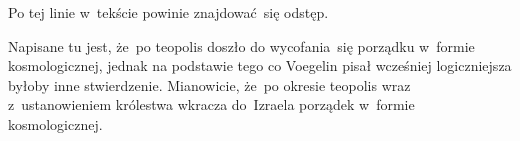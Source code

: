 \documentclass[a4paper,11pt]{article}
\begin{document}
\vspace{\spaceFour}





\start {} Po tej linie w~tekście powinie znajdować~się
odstęp.

\vspace{\spaceFour}





\start {} Napisane tu jest, że~po teopolis doszło do
wycofania~się porządku w~formie kosmologicznej, jednak na podstawie
tego co Voegelin pisał wcześniej logiczniejsza byłoby inne
stwierdzenie. Mianowicie, że~po okresie teopolis wraz z~ustanowieniem
królestwa wkracza do~Izraela porządek w~formie kosmologicznej.





\newpage

\end{document}
